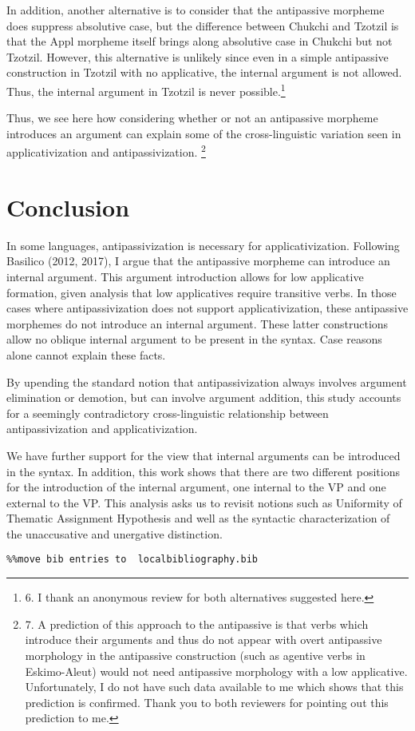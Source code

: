 \documentclass[output=paper,modfonts,nonflat]{langsci/langscibook}
\begin{document}
In addition, another alternative is to consider that the antipassive morpheme does suppress absolutive case, but the difference between Chukchi and Tzotzil is that the Appl morpheme itself brings along absolutive case in Chukchi but not Tzotzil.\textstyleFootnoteSymbol{} However, this alternative is unlikely since even in a simple antipassive construction in Tzotzil with no applicative, the internal argument is not allowed.  Thus, the internal argument in Tzotzil is never possible.\footnote{6.  I thank an anonymous review for both alternatives suggested here.} \textstyleFootnoteSymbol{} 

Thus, we see here how considering whether or not an antipassive morpheme introduces an argument can explain some of the cross-linguistic variation seen in applicativization and antipassivization.\textstyleFootnoteSymbol{} \footnote{7.  A prediction of this approach to the antipassive is that verbs which introduce their arguments and thus do not appear with overt antipassive morphology in the antipassive construction (such as agentive verbs in Eskimo-Aleut) would not need antipassive morphology with a low applicative.   Unfortunately, I do not have such data available to me which shows that this prediction is confirmed.  Thank you to both reviewers for pointing out this prediction to me.}    

\section{Conclusion} %

In some languages, antipassivization is necessary for applicativization.  Following Basilico (2012, 2017), I argue that the antipassive morpheme can introduce an internal argument.  This argument introduction allows for low applicative formation, given  analysis that low applicatives require transitive verbs.  In those cases where antipassivization does not support applicativization, these antipassive morphemes do not introduce an internal argument.  These latter constructions allow no oblique internal argument to be present in the syntax.  Case reasons alone cannot explain these facts. 

By upending the standard notion that antipassivization always involves argument elimination or demotion, but can involve argument addition, this study accounts for a seemingly contradictory cross-linguistic relationship between antipassivization and applicativization.

We have further support for the view that internal arguments can be introduced in the syntax.  In addition, this work shows that there are two different positions for the introduction of the internal argument, one internal to the VP and one external to the VP.  This analysis asks us to revisit notions such as  Uniformity of Thematic Assignment Hypothesis and well as the syntactic characterization of the unaccusative and unergative distinction. 


\begin{verbatim}%%move bib entries to  localbibliography.bib
\end{verbatim}
\sloppy\printbibliography[heading=subbibliography,notkeyword=this]
\end{document}
